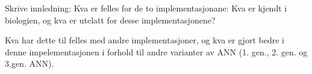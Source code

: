 Skrive innledning: Kva er felles for de to implementasjonane: Kva er kjendt i biologien, og kva er utelatt for desse implementasjonene?

Kva har dette til felles med andre implementasjoner, og kva er gjort bedre i denne impelementasjonen i forhold til andre varianter av ANN (1. gen., 2. gen. og 3.gen. ANN).









%
%
%





